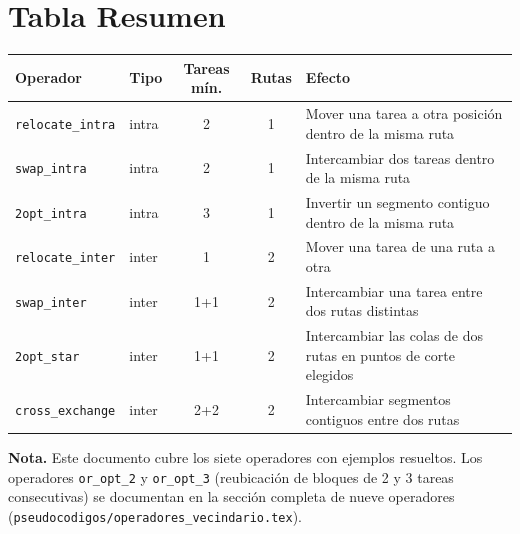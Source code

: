 \documentclass[12pt, a4paper]{article}
\begin{document}
\section{Tabla Resumen}

\begin{center}
\renewcommand{\arraystretch}{1.4}
\begin{tabular}{llccp{5cm}}
\hline
\textbf{Operador} & \textbf{Tipo} & \textbf{Tareas mín.} & \textbf{Rutas} & \textbf{Efecto} \\
\hline
\texttt{relocate\_intra} & intra & 2 & 1 & Mover una tarea a otra posición dentro de la misma ruta \\
\texttt{swap\_intra}     & intra & 2 & 1 & Intercambiar dos tareas dentro de la misma ruta \\
\texttt{2opt\_intra}     & intra & 3 & 1 & Invertir un segmento contiguo dentro de la misma ruta \\
\texttt{relocate\_inter} & inter & 1 & 2 & Mover una tarea de una ruta a otra \\
\texttt{swap\_inter}     & inter & 1+1 & 2 & Intercambiar una tarea entre dos rutas distintas \\
\texttt{2opt\_star}      & inter & 1+1 & 2 & Intercambiar las colas de dos rutas en puntos de corte elegidos \\
\texttt{cross\_exchange} & inter & 2+2 & 2 & Intercambiar segmentos contiguos entre dos rutas \\
\hline
\end{tabular}
\end{center}

\noindent\textbf{Nota.} Este documento cubre los siete operadores con
ejemplos resueltos.  Los operadores \texttt{or\_opt\_2} y \texttt{or\_opt\_3}
(reubicación de bloques de 2 y 3 tareas consecutivas) se documentan en la
sección completa de nueve operadores
(\texttt{pseudocodigos/operadores\_vecindario.tex}).
\end{document}
